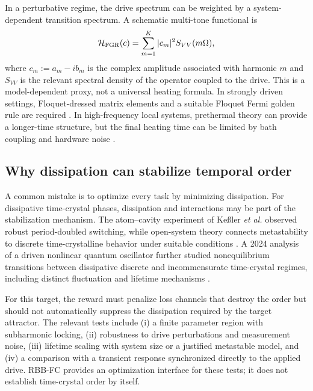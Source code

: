 \documentclass[10pt,twoside]{article}
\begin{document}
In a perturbative regime, the drive spectrum can be weighted by a system-dependent transition spectrum. A schematic multi-tone functional is
\begin{equation}
\mathcal H_{\rm FGR}(c)=\sum_{m=1}^{K}|c_m|^2 S_{VV}(m\Omega),
\label{eq:heatingproxy}
\end{equation}
where $c_m:=a_m-i b_m$ is the complex amplitude associated with harmonic $m$ and $S_{VV}$ is the relevant spectral density of the operator coupled to the drive. This is a model-dependent proxy, not a universal heating formula. In strongly driven settings, Floquet-dressed matrix elements and a suitable Floquet Fermi golden rule are required \citep{ikeda2021floquetfgr}. In high-frequency local systems, prethermal theory can provide a longer-time structure, but the final heating time can be limited by bath coupling and hardware noise \citep{abanin2017effective,ho2023floquetprethermal}.

\subsection{Why dissipation can stabilize temporal order}

A common mistake is to optimize every task by minimizing dissipation. For dissipative time-crystal phases, dissipation and interactions may be part of the stabilization mechanism. The atom--cavity experiment of Ke{\ss}ler \emph{et al.} observed robust period-doubled switching, while open-system theory connects metastability to discrete time-crystalline behavior under suitable conditions \citep{kessler2021dissipativetimecrystal,gambetta2019openDTC}. A 2024 analysis of a driven nonlinear quantum oscillator further studied nonequilibrium transitions between dissipative discrete and incommensurate time-crystal regimes, including distinct fluctuation and lifetime mechanisms \citep{cabot2024nonequilibrium}.

For this target, the reward must penalize loss channels that destroy the order but should not automatically suppress the dissipation required by the target attractor. The relevant tests include (i) a finite parameter region with subharmonic locking, (ii) robustness to drive perturbations and measurement noise, (iii) lifetime scaling with system size or a justified metastable model, and (iv) a comparison with a transient response synchronized directly to the applied drive. RBB-FC provides an optimization interface for these tests; it does not establish time-crystal order by itself.
\end{document}

